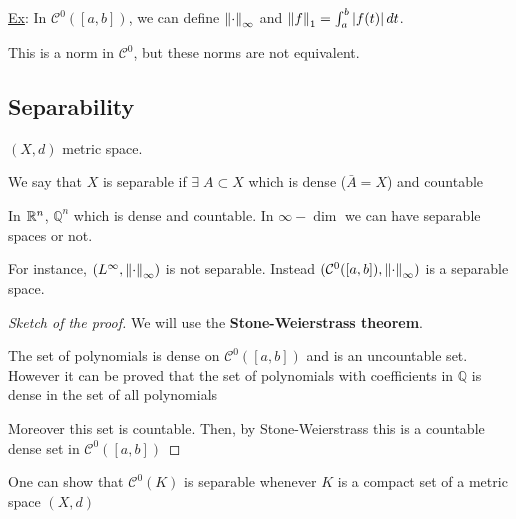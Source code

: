 \noindent\underline{Ex}: In \(\mathcal{C}^0([a,b])\), we can define \(\norm{\cdot}_{\infty}\) and \(\norm{f}_1 = \int_a^b\abs{f(t)} \, dt\).

This is a norm in \(\mathcal{C}^0\), but these norms are not equivalent. 


\subsection*{Separability}
\((X, d)\) metric space. 
\begin{definition}
    We say that \(X\) is separable if \(\exists \; A \subset X\) which is dense (\(\bar{A} = X\)) and countable 
\end{definition}
In \(\mathbb{R}^n\), \(\mathbb{Q}^n\) which is dense and countable. In \(\infty-\dim\) we can have separable spaces or not. 

For instance, \((L^{\infty}, \norm{\cdot}_{\infty})\) is not separable. Instead \((\mathcal{C}^0([a,b]), \norm{\cdot}_{\infty})\) is a separable space. 

\begin{proof}[Sketch of the proof]
    We will use the \textbf{Stone-Weierstrass theorem}.

    The set of polynomials is dense on \(\mathcal{C}^0([a,b])\) and is an uncountable set. 
    However it can be proved that the set of polynomials with coefficients in \(\mathbb{Q}\) is dense in the set of all polynomials

    Moreover this set is countable. Then, by Stone-Weierstrass this is a countable dense set in \(\mathcal{C}^0([a,b])\)
\end{proof}
\begin{remark}
    One can show that \(\mathcal{C}^0(K)\) is separable whenever \(K\) is a compact set of a metric space \((X,d)\)
\end{remark}

